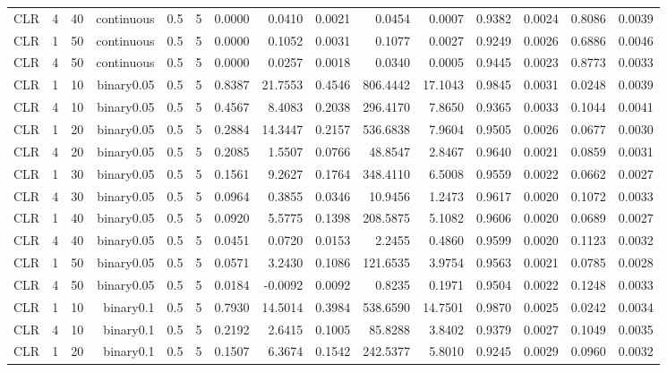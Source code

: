 \begin{longtable}{rrrrrrrrrrrrrrr}
  CLR & 4 & 40 & continuous & 0.5 & 5 & 0.0000 & 0.0410 & 0.0021 & 0.0454 & 0.0007 & 0.9382 & 0.0024 & 0.8086 & 0.0039 \\ 
  CLR & 1 & 50 & continuous & 0.5 & 5 & 0.0000 & 0.1052 & 0.0031 & 0.1077 & 0.0027 & 0.9249 & 0.0026 & 0.6886 & 0.0046 \\ 
  CLR & 4 & 50 & continuous & 0.5 & 5 & 0.0000 & 0.0257 & 0.0018 & 0.0340 & 0.0005 & 0.9445 & 0.0023 & 0.8773 & 0.0033 \\ 
  CLR & 1 & 10 & binary0.05 & 0.5 & 5 & 0.8387 & 21.7553 & 0.4546 & 806.4442 & 17.1043 & 0.9845 & 0.0031 & 0.0248 & 0.0039 \\ 
  CLR & 4 & 10 & binary0.05 & 0.5 & 5 & 0.4567 & 8.4083 & 0.2038 & 296.4170 & 7.8650 & 0.9365 & 0.0033 & 0.1044 & 0.0041 \\ 
  CLR & 1 & 20 & binary0.05 & 0.5 & 5 & 0.2884 & 14.3447 & 0.2157 & 536.6838 & 7.9604 & 0.9505 & 0.0026 & 0.0677 & 0.0030 \\ 
  CLR & 4 & 20 & binary0.05 & 0.5 & 5 & 0.2085 & 1.5507 & 0.0766 & 48.8547 & 2.8467 & 0.9640 & 0.0021 & 0.0859 & 0.0031 \\ 
  CLR & 1 & 30 & binary0.05 & 0.5 & 5 & 0.1561 & 9.2627 & 0.1764 & 348.4110 & 6.5008 & 0.9559 & 0.0022 & 0.0662 & 0.0027 \\ 
  CLR & 4 & 30 & binary0.05 & 0.5 & 5 & 0.0964 & 0.3855 & 0.0346 & 10.9456 & 1.2473 & 0.9617 & 0.0020 & 0.1072 & 0.0033 \\ 
  CLR & 1 & 40 & binary0.05 & 0.5 & 5 & 0.0920 & 5.5775 & 0.1398 & 208.5875 & 5.1082 & 0.9606 & 0.0020 & 0.0689 & 0.0027 \\ 
  CLR & 4 & 40 & binary0.05 & 0.5 & 5 & 0.0451 & 0.0720 & 0.0153 & 2.2455 & 0.4860 & 0.9599 & 0.0020 & 0.1123 & 0.0032 \\ 
  CLR & 1 & 50 & binary0.05 & 0.5 & 5 & 0.0571 & 3.2430 & 0.1086 & 121.6535 & 3.9754 & 0.9563 & 0.0021 & 0.0785 & 0.0028 \\ 
  CLR & 4 & 50 & binary0.05 & 0.5 & 5 & 0.0184 & -0.0092 & 0.0092 & 0.8235 & 0.1971 & 0.9504 & 0.0022 & 0.1248 & 0.0033 \\ 
  CLR & 1 & 10 & binary0.1 & 0.5 & 5 & 0.7930 & 14.5014 & 0.3984 & 538.6590 & 14.7501 & 0.9870 & 0.0025 & 0.0242 & 0.0034 \\ 
  CLR & 4 & 10 & binary0.1 & 0.5 & 5 & 0.2192 & 2.6415 & 0.1005 & 85.8288 & 3.8402 & 0.9379 & 0.0027 & 0.1049 & 0.0035 \\ 
  CLR & 1 & 20 & binary0.1 & 0.5 & 5 & 0.1507 & 6.3674 & 0.1542 & 242.5377 & 5.8010 & 0.9245 & 0.0029 & 0.0960 & 0.0032 \\ 

\end{longtable}
